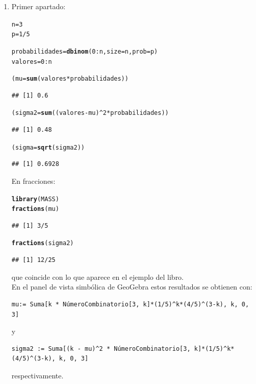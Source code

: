 \documentclass[10pt,a4paper]{article}\usepackage[]{graphicx}\usepackage[]{color}
\makeatletter
\newcommand{\hlnum}[1]{\textcolor[rgb]{0.686,0.059,0.569}{#1}}%
\newcommand{\hlopt}[1]{\textcolor[rgb]{0,0,0}{#1}}%
\newcommand{\hlstd}[1]{\textcolor[rgb]{0.345,0.345,0.345}{#1}}%
\newcommand{\hlkwb}[1]{\textcolor[rgb]{0.69,0.353,0.396}{#1}}%
\newcommand{\hlkwc}[1]{\textcolor[rgb]{0.333,0.667,0.333}{#1}}%
\newcommand{\hlkwd}[1]{\textcolor[rgb]{0.737,0.353,0.396}{\textbf{#1}}}%
\newenvironment{kframe}{%
 \def\at@end@of@kframe{}%
 \ifinner\ifhmode%
  \def\at@end@of@kframe{\end{minipage}}%
  \begin{minipage}{\columnwidth}%
 \fi\fi%
 \def\FrameCommand##1{\hskip\@totalleftmargin \hskip-\fboxsep
 \colorbox{shadecolor}{##1}\hskip-\fboxsep
     \hskip-\linewidth \hskip-\@totalleftmargin \hskip\columnwidth}%
 \MakeFramed {\advance\hsize-\width
   \@totalleftmargin\z@ \linewidth\hsize
   \@setminipage}}%
 {\par\unskip\endMakeFramed%
 \at@end@of@kframe}
\newenvironment{knitrout}{}{} %
\makeatother
\begin{document}
\begin{enumerate}
  \item Primer apartado:
\begin{knitrout}
\color{fgcolor}\begin{kframe}
\begin{alltt}
\hlstd{n} \hlkwb{=} \hlnum{3}
\hlstd{p} \hlkwb{=} \hlnum{1}\hlopt{/}\hlnum{5}

\hlstd{probabilidades} \hlkwb{=} \hlkwd{dbinom}\hlstd{(}\hlnum{0}\hlopt{:}\hlstd{n,} \hlkwc{size}\hlstd{=n,} \hlkwc{prob}\hlstd{=p)}
\hlstd{valores} \hlkwb{=} \hlnum{0}\hlopt{:}\hlstd{n}

\hlstd{(mu} \hlkwb{=} \hlkwd{sum}\hlstd{(valores} \hlopt{*} \hlstd{probabilidades))}
\end{alltt}
\begin{verbatim}
## [1] 0.6
\end{verbatim}
\begin{alltt}
\hlstd{(sigma2} \hlkwb{=} \hlkwd{sum}\hlstd{((valores} \hlopt{-} \hlstd{mu)}\hlopt{^}\hlnum{2} \hlopt{*} \hlstd{probabilidades))}
\end{alltt}
\begin{verbatim}
## [1] 0.48
\end{verbatim}
\begin{alltt}
\hlstd{(sigma} \hlkwb{=} \hlkwd{sqrt}\hlstd{(sigma2))}
\end{alltt}
\begin{verbatim}
## [1] 0.6928
\end{verbatim}
\end{kframe}
\end{knitrout}

        En fracciones:
\begin{knitrout}
\color{fgcolor}\begin{kframe}
\begin{alltt}
\hlkwd{library}\hlstd{(MASS)}
\hlkwd{fractions}\hlstd{(mu)}
\end{alltt}
\begin{verbatim}
## [1] 3/5
\end{verbatim}
\begin{alltt}
\hlkwd{fractions}\hlstd{(sigma2)}
\end{alltt}
\begin{verbatim}
## [1] 12/25
\end{verbatim}
\end{kframe}
\end{knitrout}
        que coincide con lo que aparece en el ejemplo del libro.\\
        En el panel de vista simbólica de GeoGebra estos resultados se obtienen con:
\begin{verbatim}
mu:= Suma[k * NúmeroCombinatorio[3, k]*(1/5)^k*(4/5)^(3-k), k, 0, 3]
\end{verbatim}
        y
\begin{verbatim}
sigma2 := Suma[(k - mu)^2 * NúmeroCombinatorio[3, k]*(1/5)^k*(4/5)^(3-k), k, 0, 3]
\end{verbatim}
        respectivamente.





\end{enumerate}
\end{document}
